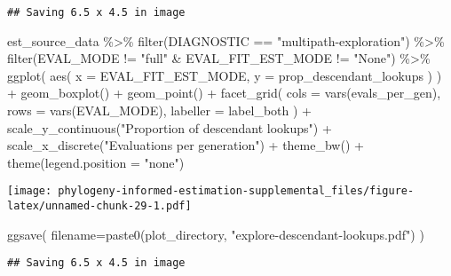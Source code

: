 \documentclass[
]{book}
\newenvironment{Shaded}{\begin{snugshade}}{\end{snugshade}}
\newcommand{\AttributeTok}[1]{\textcolor[rgb]{0.77,0.63,0.00}{#1}}
\newcommand{\FunctionTok}[1]{\textcolor[rgb]{0.00,0.00,0.00}{#1}}
\newcommand{\NormalTok}[1]{#1}
\newcommand{\SpecialCharTok}[1]{\textcolor[rgb]{0.00,0.00,0.00}{#1}}
\newcommand{\StringTok}[1]{\textcolor[rgb]{0.31,0.60,0.02}{#1}}
\begin{document}
\begin{verbatim}
## Saving 6.5 x 4.5 in image
\end{verbatim}

\begin{Shaded}
\begin{Highlighting}[]
\NormalTok{est\_source\_data }\SpecialCharTok{\%\textgreater{}\%}
  \FunctionTok{filter}\NormalTok{(DIAGNOSTIC }\SpecialCharTok{==} \StringTok{"multipath{-}exploration"}\NormalTok{) }\SpecialCharTok{\%\textgreater{}\%}
  \FunctionTok{filter}\NormalTok{(EVAL\_MODE }\SpecialCharTok{!=} \StringTok{"full"} \SpecialCharTok{\&}\NormalTok{ EVAL\_FIT\_EST\_MODE }\SpecialCharTok{!=} \StringTok{"None"}\NormalTok{) }\SpecialCharTok{\%\textgreater{}\%}
  \FunctionTok{ggplot}\NormalTok{(}
      \FunctionTok{aes}\NormalTok{(}
        \AttributeTok{x =}\NormalTok{ EVAL\_FIT\_EST\_MODE,}
        \AttributeTok{y =}\NormalTok{ prop\_descendant\_lookups}
\NormalTok{      )}
\NormalTok{    ) }\SpecialCharTok{+}
    \FunctionTok{geom\_boxplot}\NormalTok{() }\SpecialCharTok{+}
    \FunctionTok{geom\_point}\NormalTok{() }\SpecialCharTok{+}
    \FunctionTok{facet\_grid}\NormalTok{(}
      \AttributeTok{cols =} \FunctionTok{vars}\NormalTok{(evals\_per\_gen),}
      \AttributeTok{rows =} \FunctionTok{vars}\NormalTok{(EVAL\_MODE),}
      \AttributeTok{labeller =}\NormalTok{ label\_both}
\NormalTok{    ) }\SpecialCharTok{+}
    \FunctionTok{scale\_y\_continuous}\NormalTok{(}\StringTok{"Proportion of descendant lookups"}\NormalTok{) }\SpecialCharTok{+}
    \FunctionTok{scale\_x\_discrete}\NormalTok{(}\StringTok{"Evaluations per generation"}\NormalTok{) }\SpecialCharTok{+}
    \FunctionTok{theme\_bw}\NormalTok{() }\SpecialCharTok{+}
    \FunctionTok{theme}\NormalTok{(}\AttributeTok{legend.position =} \StringTok{"none"}\NormalTok{)}
\end{Highlighting}
\end{Shaded}

\texttt{[image: phylogeny-informed-estimation-supplemental\_files/figure-latex/unnamed-chunk-29-1.pdf]}

\begin{Shaded}
\begin{Highlighting}[]
\FunctionTok{ggsave}\NormalTok{(}
   \AttributeTok{filename=}\FunctionTok{paste0}\NormalTok{(plot\_directory, }\StringTok{"explore{-}descendant{-}lookups.pdf"}\NormalTok{)}
\NormalTok{)}
\end{Highlighting}
\end{Shaded}

\begin{verbatim}
## Saving 6.5 x 4.5 in image
\end{verbatim}
\end{document}
